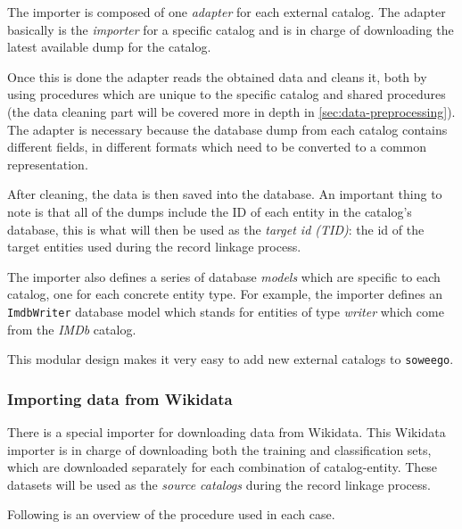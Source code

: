 \documentclass[epsfig,a4paper,11pt,titlepage,twoside,openany]{book}
\begin{document}
The importer is composed of one \textit{adapter} for each external catalog. The adapter basically is the \textit{importer} for a specific catalog and is in charge of downloading the latest available dump for the catalog. 


Once this is done the adapter reads the obtained data and cleans it, both by using procedures which are unique to the specific catalog and shared procedures (the data cleaning part will be covered more in depth in \autoref{sec:data-preprocessing}). 
The adapter is necessary because the database dump from each catalog contains different fields, in different formats which need to be converted to a common representation. 


After cleaning, the data is then saved into the database. An important thing to note is that all of the dumps include the ID of each entity in the catalog's database, this is what will then be used as the \textit{target id (TID)}: the id of the target entities used during the  record linkage process.

The importer also defines a series of  database \textit{models} which are specific to each catalog, one for each concrete entity type. For example, the importer defines an \texttt{ImdbWriter} database model which stands for entities of type \textit{writer} which come from the \textit{IMDb} catalog.

This modular design makes it very easy to add new external catalogs to \texttt{soweego}.


\subsubsection{Importing data from Wikidata}
\label{sec:importing-from-wikidata}

There is a special importer for downloading data from Wikidata. This Wikidata importer is in charge of downloading both the training and classification sets, which are downloaded separately for each combination of catalog-entity. These datasets will be used as the \textit{source catalogs} during the record linkage process.

Following is an overview of the procedure used in each case. 
\end{document}
